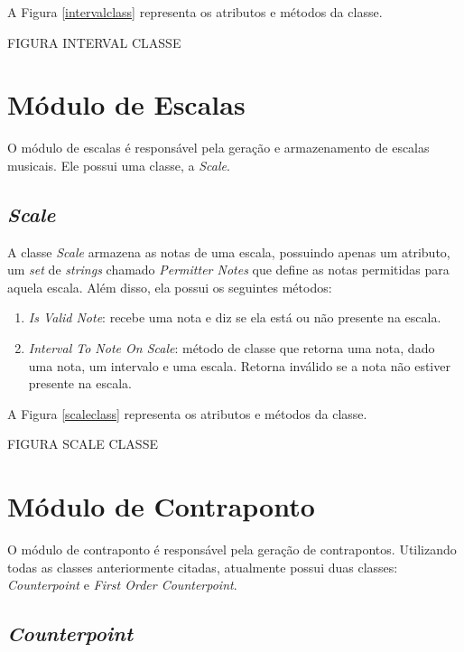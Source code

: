       A Figura \ref{intervalclass} representa os atributos e métodos da classe.

      FIGURA INTERVAL CLASSE

  \section[Módulo de Escalas]{Módulo de Escalas}

    O módulo de escalas é responsável pela geração e armazenamento de escalas musicais. Ele possui uma classe, a \textit{Scale}.

    \subsection[\textit{Scale}]{\textit{Scale}}

    A classe \textit{Scale} armazena as notas de uma escala, possuindo apenas um atributo, um \textit{set} de \textit{strings} chamado \textit{Permitter Notes} que define as notas permitidas para aquela escala. Além disso, ela possui os seguintes métodos:

    \begin{enumerate}
      \item \textit{Is Valid Note}: recebe uma nota e diz se ela está ou não presente na escala.
      \item \textit{Interval To Note On Scale}: método de classe que retorna uma nota, dado uma nota, um intervalo e uma escala. Retorna inválido se a nota não estiver presente na escala.
    \end{enumerate}


    A Figura \ref{scaleclass} representa os atributos e métodos da classe.

    FIGURA SCALE CLASSE

  \section[Módulo de Contraponto]{Módulo de Contraponto}

    O módulo de contraponto é responsável pela geração de contrapontos. Utilizando todas as classes anteriormente citadas, atualmente possui duas classes: \textit{Counterpoint} e  \textit{First Order Counterpoint}.

    \subsection[\textit{Counterpoint}]{\textit{Counterpoint}}

